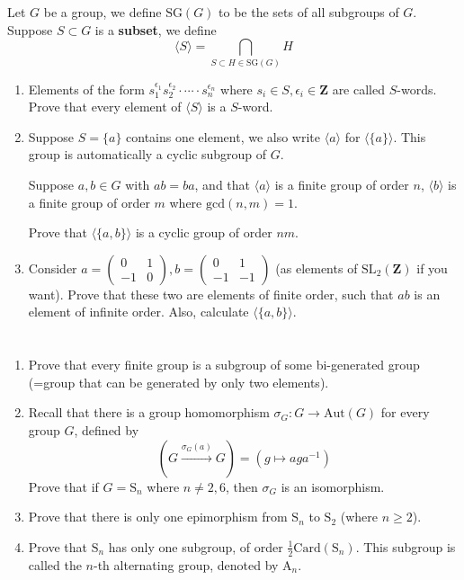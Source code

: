 \documentclass{report}
\newcommand{\Mat}[4]{\begin{pmatrix}{#1}&{#2}\\{#3}&{#4}\end{pmatrix}}
\begin{document}
\section{}
Let $G$ be a group, we define $\text{SG}(G)$ to be the sets of all subgroups of $G$. Suppose $S\subset G$ is a \textbf{subset}, we define
\[\langle S\rangle = \bigcap_{S \subset H \in \text{SG}(G)} H\]
\begin{enumerate}
\item Elements of the form $s_1^{\epsilon_1}s_2^{\epsilon_2}\cdot\cdots\cdot s_n^{\epsilon_n}$ where $s_i \in S, \epsilon_i \in \mathbf{Z}$ are called $S$-words. Prove that every element of $\langle S\rangle$ is a $S$-word.
\item Suppose $S = \{a\}$ contains one element, we also write $\langle a \rangle$ for $\langle \{a\} \rangle$. This group is automatically a cyclic subgroup of $G$.

Suppose $a,b \in G$ with $ab = ba$, and that $\langle a \rangle$ is a finite group of order $n$, $\langle b \rangle$ is a finite group of order $m$ where $\text{gcd}(n,m) = 1$.

Prove that $\langle \{a,b\} \rangle$ is a cyclic group of order $nm$.
\item Consider $a = \Mat{0}{1}{-1}{0}, b = \Mat{0}{1}{-1}{-1}$ (as elements of $\text{SL}_2(\mathbf{Z})$ if you want). Prove that these two are elements of finite order, such that $ab$ is an element of infinite order. Also, calculate $\langle \{a,b\} \rangle$.
\end{enumerate}
\section{}
\begin{enumerate}
\item Prove that every finite group is a subgroup of some bi-generated group (=group that can be generated by only two elements).
\item
Recall that there is a group homomorphism $\sigma_G: G \rightarrow \text{Aut}(G)$ for every group $G$, defined by
\[\left(G \xrightarrow{\sigma_G (a)} G \right)= \left( g \mapsto aga^{-1} \right)\]
Prove that if $G = \text{S}_n$ where $n \neq 2,6$, then $\sigma_G$ is an isomorphism.
\item Prove that there is only one epimorphism from $\text{S}_n$ to $\text{S}_2$ (where $n \ge 2$).
\item Prove that $\text{S}_n$ has only one subgroup, of order $\frac{1}{2}\text{Card}(\text{S}_n)$. This subgroup is called the $n$-th alternating group, denoted by $\text{A}_n$.
\end{enumerate}
\end{document}
